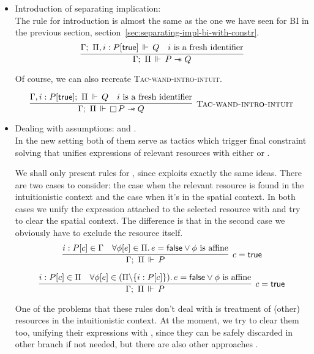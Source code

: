 \begin{itemize}
\item Introduction of separating implication: \\
  The rule for introduction is almost the same as the one we have seen for BI in the previous section, section~\ref{sec:separating-impl-bi-with-constr}.
  \[
  \infer{\entailsD P \wand Q}
        {\entails {\IntuD} {\SpatD, i : P[\true]} {Q} &
         i \text{ is a fresh identifier}}
  \]

  Of course, we can also recreate \textsc{Tac-wand-intro-intuit}.

  \[\infer[\textsc{Tac-wand-intro-intuit}]
      {\entailsD \intuit P \wand Q}
      {\entails {\IntuD, i : P[\true]} {\SpatD} {Q} &
       i \text{ is a fresh identifier}}
  \]

\item Dealing with assumptions:  and .\\
  In the new setting both of them serve as tactics which trigger final constraint solving that unifies expressions of relevant resources with either \true or \false.

  We shall only present rules for , since  exploits exactly the same ideas.
  There are two cases to consider: the case when the relevant resource is found in the intuitionistic context and the case when it's in the spatial context.
  In both cases we unify the expression attached to the selected resource with \true and try to clear the spatial context.
  The difference is that in the second case we obviously have to exclude the resource itself.
  \[
    \infer[c = \true]
          {\entailsD P}
          {i : P[c] \in \IntuD &
           \forall \phi[e] \in \SpatD.\, e = \false \vee \phi \text{ is affine}}
  \]

  \[
    \infer[c = \true]
          {\entailsD P}
          {i : P[c] \in \SpatD &
           \forall \phi[e] \in (\SpatD \backslash \{i : P[c]\}).\, e = \false \vee \phi \text{ is affine}}
  \]

  One of the problems that these rules don't deal with is treatment of (other) resources in the intuitionistic context.
  At the moment, we try to clear them too, unifying their expressions with \false, since they can be safely discarded in other branch if not needed, but there are also other approaches \cite[Section 15.3]{pfenningLogicProgrammingLecture2007}.


\end{itemize}
